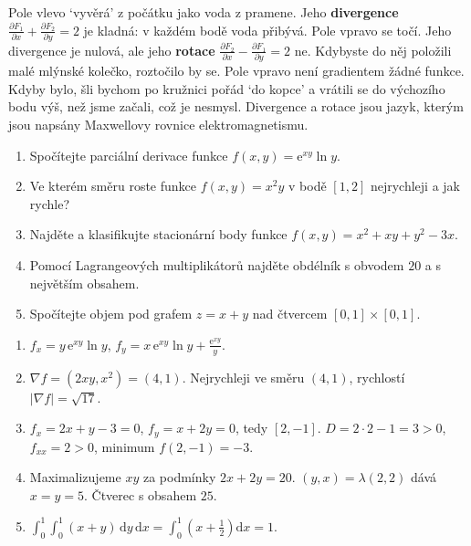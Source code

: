 Pole vlevo `vyvěrá' z počátku jako voda z pramene. Jeho \textbf{divergence} $\frac{\partial F_1}{\partial x} + \frac{\partial F_2}{\partial y} = 2$ je kladná: v každém bodě voda přibývá. Pole vpravo se točí. Jeho divergence je nulová, ale jeho \textbf{rotace} $\frac{\partial F_2}{\partial x} - \frac{\partial F_1}{\partial y} = 2$ ne. Kdybyste do něj položili malé mlýnské kolečko, roztočilo by se. Pole vpravo není gradientem žádné funkce. Kdyby bylo, šli bychom po kružnici pořád `do kopce' a vrátili se do výchozího bodu výš, než jsme začali, což je nesmysl. Divergence a rotace jsou jazyk, kterým jsou napsány Maxwellovy rovnice elektromagnetismu.

\begin{problem}
  \begin{enumerate}[label=(\alph*)]
    \item Spočítejte parciální derivace funkce $f(x, y) = \mathrm{e}^{xy}\ln y$.
    \item Ve kterém směru roste funkce $f(x, y) = x^2y$ v bodě $[1, 2]$ nejrychleji a jak rychle?
    \item Najděte a klasifikujte stacionární body funkce $f(x, y) = x^2 + xy + y^2 - 3x$.
    \item Pomocí Lagrangeových multiplikátorů najděte obdélník s obvodem $20$ a s největším obsahem.
    \item Spočítejte objem pod grafem $z = x + y$ nad čtvercem $[0, 1]\times[0, 1]$.
  \end{enumerate}
\end{problem}

\begin{solution}
  \begin{enumerate}[label=(\alph*)]
    \item $f_x = y\,\mathrm{e}^{xy}\ln y$, $f_y = x\,\mathrm{e}^{xy}\ln y + \frac{\mathrm{e}^{xy}}{y}$.
    \item $\nabla f = (2xy, x^2) = (4, 1)$. Nejrychleji ve směru $(4, 1)$, rychlostí $|\nabla f| = \sqrt{17}$.
    \item $f_x = 2x + y - 3 = 0$, $f_y = x + 2y = 0$, tedy $[2, -1]$. $D = 2\cdot 2 - 1 = 3 > 0$, $f_{xx} = 2 > 0$, minimum $f(2, -1) = -3$.
    \item Maximalizujeme $xy$ za podmínky $2x + 2y = 20$. $(y, x) = \lambda(2, 2)$ dává $x = y = 5$. Čtverec s obsahem $25$.
    \item $\int_0^1\int_0^1(x + y)\,\mathrm{d}y\,\mathrm{d}x = \int_0^1\left(x + \frac{1}{2}\right)\mathrm{d}x = 1$.
  \end{enumerate}
\end{solution}

